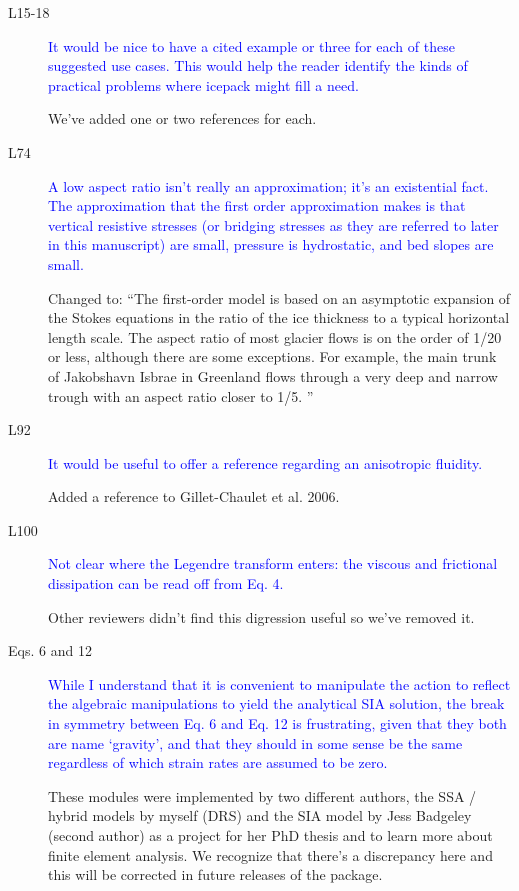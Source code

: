 \documentclass{article}
\theoremstyle{definition}
\theoremstyle{plain}
\begin{document}
\begin{description}
\item[L15-18] \textcolor{blue}{It would be nice to have a cited example or three for each of these
suggested use cases. This would help the reader identify the kinds of
practical problems where icepack might fill a need.}

We've added one or two references for each.

\item[L74] \textcolor{blue}{A low aspect ratio isn't really an approximation; it’s an existential fact.
The approximation that the first order approximation makes is that vertical resistive stresses (or bridging stresses as they are referred to later
in this manuscript) are small, pressure is hydrostatic, and bed slopes are
small.}

Changed to: ``The first-order model is based on an asymptotic expansion of the Stokes equations in the ratio of the ice thickness to a typical horizontal length scale.
The aspect ratio of most glacier flows is on the order of 1/20 or less, although there are some exceptions.
For example, the main trunk of Jakobshavn Isbrae in Greenland flows through a very deep and narrow trough with an aspect ratio closer to 1/5.
''

\item[L92] \textcolor{blue}{It would be useful to offer a reference regarding an anisotropic fluidity.}

Added a reference to Gillet-Chaulet et al. 2006.

\item[L100] \textcolor{blue}{Not clear where the Legendre transform enters: the viscous and frictional
dissipation can be read off from Eq. 4.}

Other reviewers didn't find this digression useful so we've removed it.

\item[Eqs. 6 and 12]\textcolor{blue}{While I understand that it is convenient to manipulate the
action to reflect the algebraic manipulations to yield the analytical SIA
solution, the break in symmetry between Eq. 6 and Eq. 12 is frustrating,
given that they both are name `gravity', and that they should in some
sense be the same regardless of which strain rates are assumed to be zero.}

These modules were implemented by two different authors, the SSA / hybrid models by myself (DRS) and the SIA model by Jess Badgeley (second author) as a project for her PhD thesis and to learn more about finite element analysis.
We recognize that there's a discrepancy here and this will be corrected in future releases of the package.


\end{description}
\end{document}
